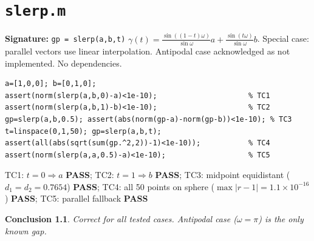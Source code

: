 \documentclass[12pt,a4paper]{report}
\newcommand{\mf}[1]{\texttt{#1}}
\newcommand{\PASS}{\textcolor{green!60!black}{\textbf{PASS}}}
\newtheorem{concl}{Conclusion}[chapter]
\begin{document}
\chapter{\mf{slerp.m}}
\begin{tcolorbox}[Abox,title=Analysis]
\textbf{Signature:} \lstinline|gp = slerp(a,b,t)|\quad
$\gamma(t)=\frac{\sin((1-t)\omega)}{\sin\omega}a+\frac{\sin(t\omega)}{\sin\omega}b$. Special case: parallel vectors use linear interpolation. Antipodal case acknowledged as not implemented. No dependencies.
\end{tcolorbox}
\begin{lstlisting}[caption={Tests for slerp.m}]
a=[1,0,0]; b=[0,1,0];
assert(norm(slerp(a,b,0)-a)<1e-10);                     % TC1
assert(norm(slerp(a,b,1)-b)<1e-10);                     % TC2
gp=slerp(a,b,0.5); assert(abs(norm(gp-a)-norm(gp-b))<1e-10); % TC3
t=linspace(0,1,50); gp=slerp(a,b,t);
assert(all(abs(sqrt(sum(gp.^2,2))-1)<1e-10));           % TC4
assert(norm(slerp(a,a,0.5)-a)<1e-10);                   % TC5
\end{lstlisting}
\begin{tcolorbox}[Pbox,title=TC1--TC5 -- All pass]
TC1: $t=0\Rightarrow a$ \PASS; TC2: $t=1\Rightarrow b$ \PASS; TC3: midpoint equidistant ($d_1=d_2=0.7654$) \PASS; TC4: all 50 points on sphere ($\max|r-1|=1.1\times10^{-16}$) \PASS; TC5: parallel fallback \PASS
\end{tcolorbox}
\begin{concl}
Correct for all tested cases. Antipodal case ($\omega=\pi$) is the only known gap.
\end{concl}

\end{document}
